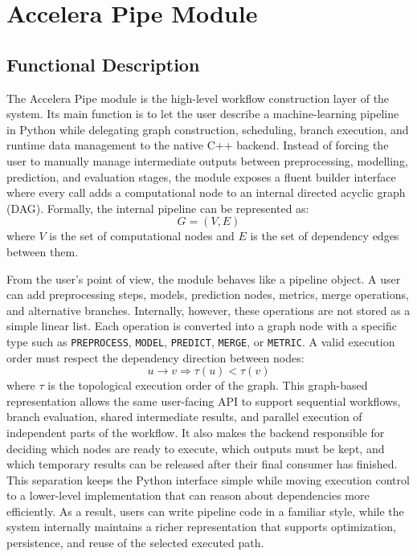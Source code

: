 \documentclass[12pt,a4paper,oneside]{report}
\begin{document}
\section{Accelera Pipe Module}
\label{sec:methodology-accelera-pipe}

\subsection{Functional Description}
The Accelera Pipe module is the high-level workflow construction layer of the
system. Its main function is to let the user describe a machine-learning pipeline
in Python while delegating graph construction, scheduling, branch execution, and
runtime data management to the native C++ backend. Instead of forcing the user to
manually manage intermediate outputs between preprocessing, modelling,
prediction, and evaluation stages, the module exposes a fluent builder interface
where every call adds a computational node to an internal directed acyclic graph
(DAG). Formally, the internal pipeline can be represented as:
\[
G = (V, E)
\]
where \(V\) is the set of computational nodes and \(E\) is the set of dependency
edges between them.

From the user's point of view, the module behaves like a pipeline object. A user
can add preprocessing steps, models, prediction nodes, metrics, merge operations,
and alternative branches. Internally, however, these operations are not stored as
a simple linear list. Each operation is converted into a graph node with a
specific type such as \texttt{PREPROCESS}, \texttt{MODEL}, \texttt{PREDICT},
\texttt{MERGE}, or \texttt{METRIC}. A valid execution order must respect the
dependency direction between nodes:
\[
u \rightarrow v \Rightarrow \tau(u) < \tau(v)
\]
where \(\tau\) is the topological execution order of the graph. This graph-based
representation allows the same user-facing API to support sequential workflows,
branch evaluation, shared intermediate results, and parallel execution of
independent parts of the workflow. It also makes the backend responsible for
deciding which nodes are ready to execute, which outputs must be kept, and which
temporary results can be released after their final consumer has finished. This
separation keeps the Python interface simple while moving execution control to a
lower-level implementation that can reason about dependencies more efficiently.
As a result, users can write pipeline code in a familiar style, while the system
internally maintains a richer representation that supports optimization,
persistence, and reuse of the selected executed path.
\end{document}
